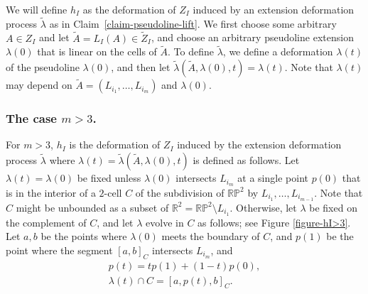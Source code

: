 \documentclass[JEP,XML,SOM,Unicode,NoFloatCountersInSection,published]{cedram}
\theoremstyle{remark}
\let\mb\mathbb
\newcommand{\projplane}{\mb{RP}^2}
\begin{document}
We will define $h_I$ as the deformation of $Z_I$ induced by an extension deformation process $\tilde \lambda$ as in Claim~\ref{claim-pseudoline-lift}.
We first choose some arbitrary $A \in Z_{I}$ and let $\tilde A = L_I(A) \in \tilde Z_{I}$, and choose an arbitrary pseudoline extension $\lambda(0)$ that is linear on the cells of $\tilde A$. To define $\tilde \lambda$, we define a deformation $\lambda(t)$ of the pseudoline $\lambda(0)$, and then let $\tilde \lambda(\tilde A,\lambda(0),t) = \lambda(t)$. Note that $\lambda(t)$ may depend on $\tilde A = (L_{i_1},\dots,L_{i_m})$ and $\lambda(0)$.

\subsubsection*{The case $m>3$.}
For $m >3$, $h_I$ is the deformation of $Z_I$ induced by the extension deformation process $\tilde \lambda$ where $\lambda(t) = \tilde \lambda(\tilde A, \lambda(0), t)$ is defined as follows.
Let $\lambda(t) = \lambda(0)$ be fixed unless $\lambda(0)$ intersects $L_{i_m}$ at a single point $p(0)$ that is in the interior of a $2$-cell $C$ of the subdivision of $\projplane$ by $L_{i_1},\dots,L_{i_{m-1}}$.
Note that $C$ might be unbounded as a subset of $\mb{R}^2 = \projplane\setminus L_{i_1}$.
Otherwise, let $\lambda$ be fixed on the complement of $C$, and let $\lambda$ evolve in $C$ as follows; see Figure \ref{figure-hI>3}.
Let $a,b$ be the points where $\lambda(0)$ meets the boundary of $C$, and
$p(1)$ be the point where the segment $[a,b]_{C}$ intersects $L_{i_m}$,
and
\begin{gather*}
p(t) = t p(1) + (1-t) p(0), \\
\lambda(t) \cap C = \left[a,p(t),b\right]_{C}.
\end{gather*}
\end{document}
